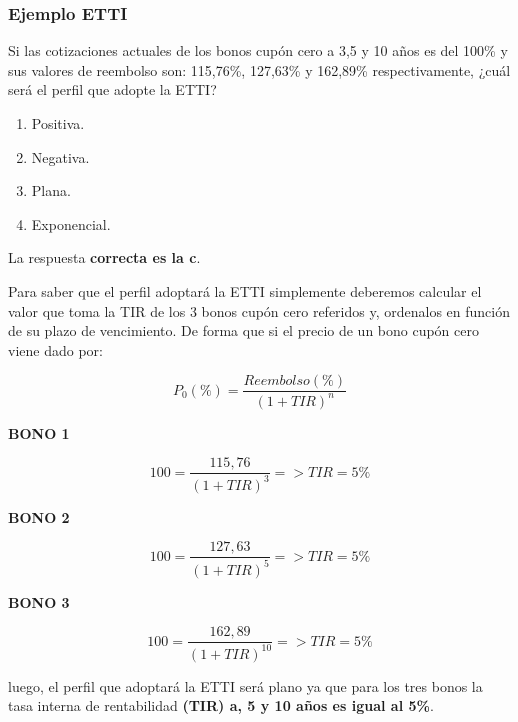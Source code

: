 \documentclass[
  letterpaper,
  DIV=11,
  numbers=noendperiod]{scrreprt}
\begin{document}
\begin{tcolorbox}
\subsubsection{Ejemplo ETTI}\label{ejemplo-etti}

Si las cotizaciones actuales de los bonos cupón cero a 3,5 y 10 años es
del 100\% y sus valores de reembolso son: 115,76\%, 127,63\% y 162,89\%
respectivamente, ¿cuál será el perfil que adopte la ETTI?

\begin{enumerate}
\def\labelenumi{\alph{enumi}.}
\item
  Positiva.
\item
  Negativa.
\item
  Plana.
\item
  Exponencial.
\end{enumerate}

\begin{tcolorbox}[enhanced jigsaw, toprule=.15mm, left=2mm, arc=.35mm, breakable, bottomrule=.15mm, opacityback=0, rightrule=.15mm, leftrule=.75mm, colframe=quarto-callout-tip-color-frame, colback=white]
\begin{minipage}[t]{5.5mm}
\textcolor{quarto-callout-tip-color}{\faLightbulb}
\end{minipage}%
\begin{minipage}[t]{\textwidth - 5.5mm}

La respuesta \textbf{correcta es la c}.

Para saber que el perfil adoptará la ETTI simplemente deberemos calcular
el valor que toma la TIR de los 3 bonos cupón cero referidos y,
ordenalos en función de su plazo de vencimiento. De forma que si el
precio de un bono cupón cero viene dado por:

\[P_0(\%)=\frac{Reembolso(\%)}{(1+TIR)^{n}}\]

\textbf{BONO 1}

\[100=\frac{115,76}{(1+TIR)^{3}}=>TIR=5\%\]

\textbf{BONO 2}

\[100=\frac{127,63}{(1+TIR)^{5}}=>TIR=5\%\]

\textbf{BONO 3}

\[100=\frac{162,89}{(1+TIR)^{10}}=>TIR=5\%\]

luego, el perfil que adoptará la ETTI será plano ya que para los tres
bonos la tasa interna de rentabilidad \textbf{(TIR) a, 5 y 10 años es
igual al 5\%}.

\end{minipage}%
\end{tcolorbox}


\end{tcolorbox}
\end{document}
